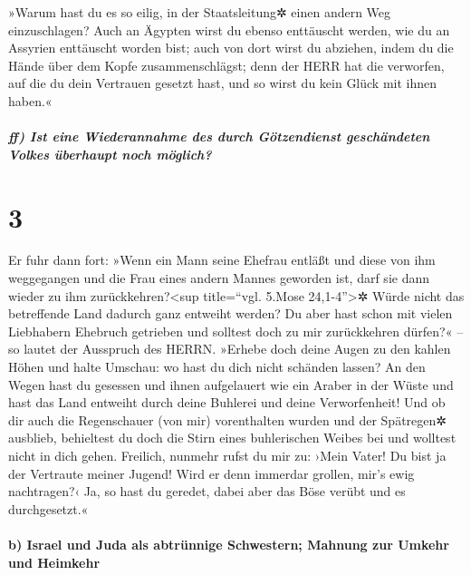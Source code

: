 »Warum hast du es so eilig, in der Staatsleitung✲ einen
andern Weg einzuschlagen? Auch an Ägypten wirst du ebenso enttäuscht
werden, wie du an Assyrien enttäuscht worden bist; auch
von dort wirst du abziehen, indem du die Hände über dem Kopfe
zusammenschlägst; denn der HERR hat die verworfen, auf die du dein
Vertrauen gesetzt hast, und so wirst du kein Glück mit ihnen haben.«

\hypertarget{ff-ist-eine-wiederannahme-des-durch-guxf6tzendienst-geschuxe4ndeten-volkes-uxfcberhaupt-noch-muxf6glich}{%
\subparagraph{ff) Ist eine Wiederannahme des durch Götzendienst
geschändeten Volkes überhaupt noch
möglich?}\label{ff-ist-eine-wiederannahme-des-durch-guxf6tzendienst-geschuxe4ndeten-volkes-uxfcberhaupt-noch-muxf6glich}}

\hypertarget{section-2}{%
\section{3}\label{section-2}}

Er fuhr dann fort: »Wenn ein Mann seine Ehefrau entläßt
und diese von ihm weggegangen und die Frau eines andern Mannes geworden
ist, darf sie dann wieder zu ihm zurückkehren?\textless sup title=``vgl.
5.Mose 24,1-4''\textgreater✲ Würde nicht das betreffende Land dadurch
ganz entweiht werden? Du aber hast schon mit vielen Liebhabern Ehebruch
getrieben und solltest doch zu mir zurückkehren dürfen?« -- so lautet
der Ausspruch des HERRN. »Erhebe doch deine Augen zu den
kahlen Höhen und halte Umschau: wo hast du dich nicht schänden lassen?
An den Wegen hast du gesessen und ihnen aufgelauert wie ein Araber in
der Wüste und hast das Land entweiht durch deine Buhlerei und deine
Verworfenheit! Und ob dir auch die Regenschauer (von mir)
vorenthalten wurden und der Spätregen✲ ausblieb, behieltest du doch die
Stirn eines buhlerischen Weibes bei und wolltest nicht in dich gehen.
Freilich, nunmehr rufst du mir zu: ›Mein Vater! Du bist ja
der Vertraute meiner Jugend! Wird er denn immerdar
grollen, mir's ewig nachtragen?‹ Ja, so hast du geredet, dabei aber das
Böse verübt und es durchgesetzt.«

\hypertarget{b-israel-und-juda-als-abtruxfcnnige-schwestern-mahnung-zur-umkehr-und-heimkehr}{%
\paragraph{b) Israel und Juda als abtrünnige Schwestern; Mahnung zur
Umkehr und
Heimkehr}\label{b-israel-und-juda-als-abtruxfcnnige-schwestern-mahnung-zur-umkehr-und-heimkehr}}

